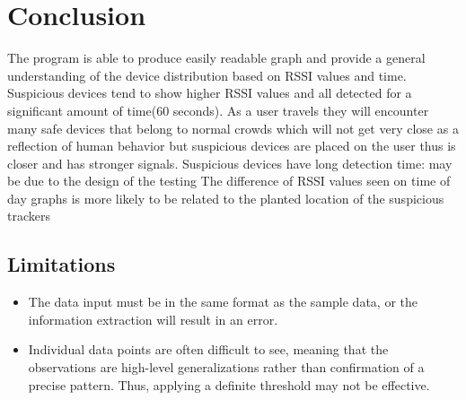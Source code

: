 \documentclass{article}
\begin{document}
\begin{multicols}{2}
\begin{center}
\end{center}


\section{Conclusion}
The program is able to produce easily readable graph and provide a general understanding of the device distribution based on RSSI values and time. Suspicious devices tend to show higher RSSI values and all detected for a significant amount of time(60 seconds). As a user travels they will encounter many safe devices that belong to normal crowds which will not get very close as a reflection of human behavior but suspicious devices are placed on the user thus is closer and has stronger signals. Suspicious devices have long detection time: may be due to the design of the testing The difference of RSSI values seen on time of day graphs is more likely to be related to the planted location of the suspicious trackers


\subsection{Limitations}

\begin{itemize}
    \item The data input must be in the same format as the sample data, or the information extraction will result in an error.
    \item Individual data points are often difficult to see, meaning that the observations are high-level generalizations rather than confirmation of a precise pattern. Thus, applying a definite threshold may not be effective.
\end{itemize}
\end{multicols}
\newpage





\end{document}
